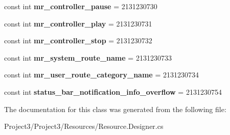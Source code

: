 \begin{DoxyCompactItemize}
const int {\bfseries mr\+\_\+controller\+\_\+pause} = 2131230730
\item 
\mbox{\label{classXaria_1_1Resource_1_1String_ae45a67ef4e44dcae462b1695c5440fd2}} 
const int {\bfseries mr\+\_\+controller\+\_\+play} = 2131230731
\item 
\mbox{\label{classXaria_1_1Resource_1_1String_a417e286ccab6e5b2288242414dff30c8}} 
const int {\bfseries mr\+\_\+controller\+\_\+stop} = 2131230732
\item 
\mbox{\label{classXaria_1_1Resource_1_1String_a2d9f07913dd41082ccfed859d562e505}} 
const int {\bfseries mr\+\_\+system\+\_\+route\+\_\+name} = 2131230733
\item 
\mbox{\label{classXaria_1_1Resource_1_1String_a27f5b8ef64008ae4322c5c343a23cbc3}} 
const int {\bfseries mr\+\_\+user\+\_\+route\+\_\+category\+\_\+name} = 2131230734
\item 
\mbox{\label{classXaria_1_1Resource_1_1String_a852100421b036c4e0073d1b044993a95}} 
const int {\bfseries status\+\_\+bar\+\_\+notification\+\_\+info\+\_\+overflow} = 2131230754
\end{DoxyCompactItemize}


The documentation for this class was generated from the following file\+:\begin{DoxyCompactItemize}
\item 
Project3/\+Project3/\+Resources/Resource.\+Designer.\+cs\end{DoxyCompactItemize}
